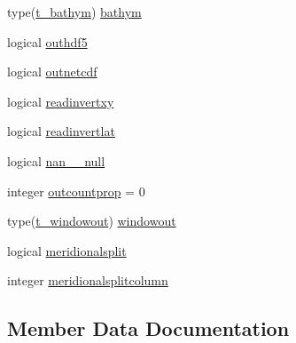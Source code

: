\begin{DoxyCompactItemize}
\item 
type(\mbox{\hyperlink{structmodulenetcdfcf__2__hdf5mohid_1_1t__bathym}{t\+\_\+bathym}}) \mbox{\hyperlink{structmodulenetcdfcf__2__hdf5mohid_1_1t__netcdfcf__2__hdf5mohid_af6678f045a809d1373060919fc9e1088}{bathym}}
\item 
logical \mbox{\hyperlink{structmodulenetcdfcf__2__hdf5mohid_1_1t__netcdfcf__2__hdf5mohid_a9bc0616ad0e6717941e5dcd8aac16a74}{outhdf5}}
\item 
logical \mbox{\hyperlink{structmodulenetcdfcf__2__hdf5mohid_1_1t__netcdfcf__2__hdf5mohid_aa7459fb2dab02a543143bafc3ce3c373}{outnetcdf}}
\item 
logical \mbox{\hyperlink{structmodulenetcdfcf__2__hdf5mohid_1_1t__netcdfcf__2__hdf5mohid_a6e945c9330eaf55d04b1547a7627196f}{readinvertxy}}
\item 
logical \mbox{\hyperlink{structmodulenetcdfcf__2__hdf5mohid_1_1t__netcdfcf__2__hdf5mohid_acc1643fd4b3585a169e2ca39f0cd205e}{readinvertlat}}
\item 
logical \mbox{\hyperlink{structmodulenetcdfcf__2__hdf5mohid_1_1t__netcdfcf__2__hdf5mohid_a3c8745c84dd7929d0c879f37c6078217}{nan\+\_\+\_\+null}}
\item 
integer \mbox{\hyperlink{structmodulenetcdfcf__2__hdf5mohid_1_1t__netcdfcf__2__hdf5mohid_afed3f6eed2db4b66363c2b4b9d4495c3}{outcountprop}} = 0
\item 
type(\mbox{\hyperlink{structmodulenetcdfcf__2__hdf5mohid_1_1t__windowout}{t\+\_\+windowout}}) \mbox{\hyperlink{structmodulenetcdfcf__2__hdf5mohid_1_1t__netcdfcf__2__hdf5mohid_a2c44ded999bc2724fa93112db4e9ecd8}{windowout}}
\item 
logical \mbox{\hyperlink{structmodulenetcdfcf__2__hdf5mohid_1_1t__netcdfcf__2__hdf5mohid_a97c36a331e426faf22572049384759e5}{meridionalsplit}}
\item 
integer \mbox{\hyperlink{structmodulenetcdfcf__2__hdf5mohid_1_1t__netcdfcf__2__hdf5mohid_a3f1892b46618ad7cbd9154b571b025b6}{meridionalsplitcolumn}}
\end{DoxyCompactItemize}


\subsection{Member Data Documentation}
\mbox{\label{structmodulenetcdfcf__2__hdf5mohid_1_1t__netcdfcf__2__hdf5mohid_af6678f045a809d1373060919fc9e1088}} 

